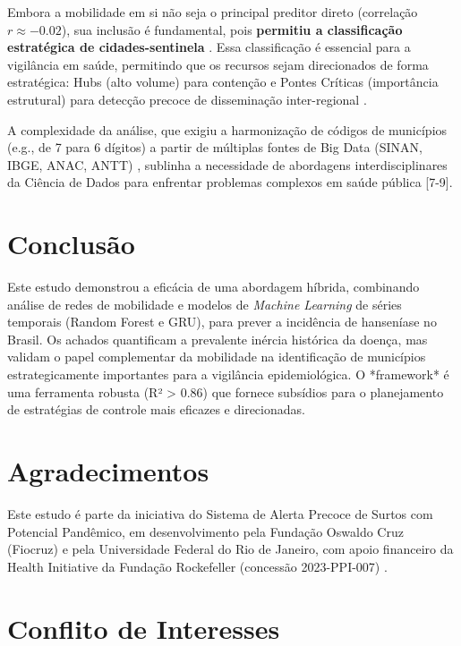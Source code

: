 \documentclass[preprint,12pt]{elsarticle}
\begin{document}
Embora a mobilidade em si não seja o principal preditor direto (correlação $r \approx -0.02$), sua inclusão é fundamental, pois \textbf{permitiu a classificação estratégica de cidades-sentinela} \cite{inovacao2024modelagem, inovacao2024analise}. Essa classificação é essencial para a vigilância em saúde, permitindo que os recursos sejam direcionados de forma estratégica: Hubs (alto volume) para contenção e Pontes Críticas (importância estrutural) para detecção precoce de disseminação inter-regional \cite{inovacao2024modelagem, inovacao2024analise}.

A complexidade da análise, que exigiu a harmonização de códigos de municípios (e.g., de 7 para 6 dígitos) a partir de múltiplas fontes de Big Data (SINAN, IBGE, ANAC, ANTT) \cite{inovacao2024modelagem, preprocessamento}, sublinha a necessidade de abordagens interdisciplinares da Ciência de Dados para enfrentar problemas complexos em saúde pública [7-9].

\section{Conclusão}

Este estudo demonstrou a eficácia de uma abordagem híbrida, combinando análise de redes de mobilidade e modelos de \textit{Machine Learning} de séries temporais (Random Forest e GRU), para prever a incidência de hanseníase no Brasil. Os achados quantificam a prevalente inércia histórica da doença, mas validam o papel complementar da mobilidade na identificação de municípios estrategicamente importantes para a vigilância epidemiológica. O *framework* é uma ferramenta robusta (R² > 0.86) que fornece subsídios para o planejamento de estratégias de controle mais eficazes e direcionadas.

\section*{Agradecimentos}

Este estudo é parte da iniciativa do Sistema de Alerta Precoce de Surtos com Potencial Pandêmico, em desenvolvimento pela Fundação Oswaldo Cruz (Fiocruz) e pela Universidade Federal do Rio de Janeiro, com apoio financeiro da Health Initiative da Fundação Rockefeller (concessão 2023-PPI-007) \cite{oliveira2024acknowledgments}.

\section*{Conflito de Interesses}
\end{document}
